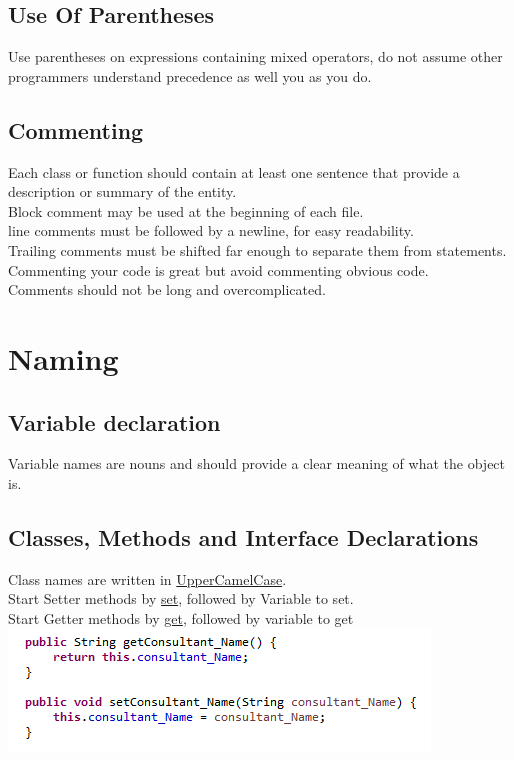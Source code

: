 \documentclass[a4paper,12pt]{report}
\begin{document}
\subsection{Use Of Parentheses}
Use parentheses on expressions containing mixed operators, do not assume other programmers understand precedence as well you as you do.
\subsection{Commenting}
Each class or function should contain at least one sentence that provide a description or summary of the entity.\\
Block comment may be used at the beginning of each file.\\
line comments must be followed by a newline, for easy readability.\\
Trailing comments must be shifted far enough to separate them from statements.\\
Commenting your code is great but avoid commenting obvious code.\\
Comments should not be long and overcomplicated. 

\section{Naming}
\subsection{Variable declaration}
Variable names are nouns and should provide a clear meaning of what the object is.
\subsection{Classes, Methods and Interface Declarations}
Class names are written in \underline{UpperCamelCase}.\\
Start Setter methods by \underline{set}, followed by Variable to set.\\
Start Getter methods by \underline{get}, followed by variable to get\\

\includegraphics{MethodNames}
\end{document}
